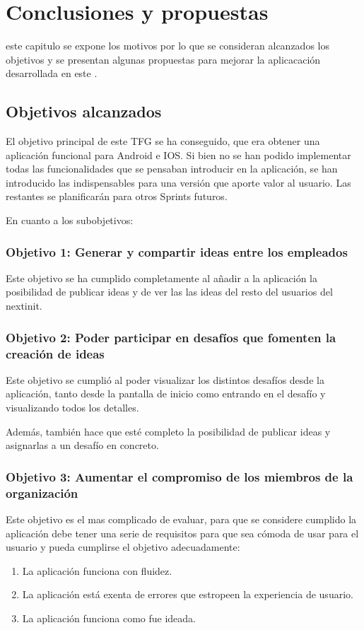 \chapter{Conclusiones y propuestas}
\label{chap:conclusiones}

 este capitulo se expone los motivos por lo que se consideran alcanzados los objetivos y se presentan algunas propuestas para mejorar la aplicacación desarrollada en este .

\section{Objetivos alcanzados}

El objetivo principal de este TFG se ha conseguido, que era obtener una aplicación funcional para
Android e IOS. Si bien no se han podido implementar todas las funcionalidades que se pensaban introducir 
en la aplicación, se han introducido las indispensables para una versión que aporte valor al usuario. Las
 restantes se planificarán para otros Sprints futuros.

En cuanto a los subobjetivos: 
\subsection{Objetivo 1: Generar y compartir ideas entre los empleados}
Este objetivo se ha cumplido completamente al añadir a la aplicación la posibilidad
de publicar ideas y de ver las las ideas del resto del usuarios del nextinit.
\subsection{Objetivo 2: Poder participar en desafíos que fomenten la creación de ideas}
Este objetivo se cumplió al poder visualizar los distintos desafíos desde la aplicación, 
tanto desde la pantalla de inicio como entrando en el desafío y visualizando todos los detalles. 

Además, también hace que esté completo la posibilidad de publicar ideas y asignarlas a un desafío
en concreto.
\subsection{Objetivo 3: Aumentar el compromiso de los miembros de la organización}
Este objetivo es el mas complicado de evaluar, para que se considere cumplido la aplicación debe tener 
una serie de requisitos para que sea cómoda de usar para el usuario y pueda cumplirse el objetivo
 adecuadamente:
\begin{enumerate}
	\item La aplicación funciona con fluidez.
	\item La aplicación está exenta de errores que estropeen la experiencia de usuario.
	\item La aplicación funciona como fue ideada.
\end{enumerate}

